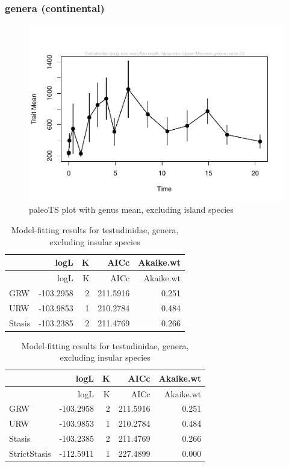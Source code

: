 \documentclass[]{article}
\begin{document}
\newpage

\subsubsection{genera (continental)}\label{genera-continental}

\begin{figure}[htbp]
\centering
\includegraphics{MA_JJ_files/figure-latex/paleoTS plot with genus mean, excluding island species-1.pdf}
\caption{paleoTS plot with genus mean, excluding island species}
\end{figure}

\begin{longtable}[]{@{}lrrrr@{}}
\caption{Model-fitting results for testudinidae, genera, excluding
insular species}\tabularnewline
\toprule
& logL & K & AICc & Akaike.wt\tabularnewline
\midrule
\endfirsthead
\toprule
& logL & K & AICc & Akaike.wt\tabularnewline
\midrule
\endhead
GRW & -103.2958 & 2 & 211.5916 & 0.251\tabularnewline
URW & -103.9853 & 1 & 210.2784 & 0.484\tabularnewline
Stasis & -103.2385 & 2 & 211.4769 & 0.266\tabularnewline
\bottomrule
\end{longtable}

\begin{longtable}[]{@{}lrrrr@{}}
\caption{Model-fitting results for testudinidae, genera, excluding
insular species}\tabularnewline
\toprule
& logL & K & AICc & Akaike.wt\tabularnewline
\midrule
\endfirsthead
\toprule
& logL & K & AICc & Akaike.wt\tabularnewline
\midrule
\endhead
GRW & -103.2958 & 2 & 211.5916 & 0.251\tabularnewline
URW & -103.9853 & 1 & 210.2784 & 0.484\tabularnewline
Stasis & -103.2385 & 2 & 211.4769 & 0.266\tabularnewline
StrictStasis & -112.5911 & 1 & 227.4899 & 0.000\tabularnewline
\bottomrule
\end{longtable}
\end{document}
